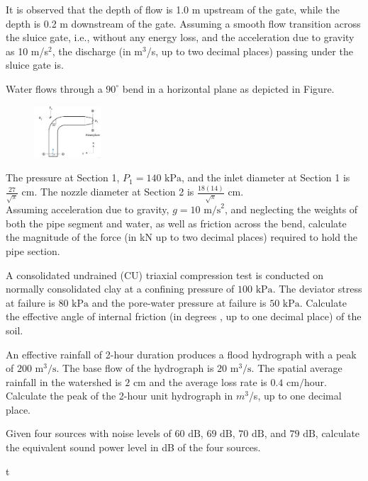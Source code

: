 It is observed that the depth of flow is 1.0 m upstream of the gate, while the depth is 0.2 m downstream of the gate. Assuming a smooth flow transition across the sluice gate, i.e., without any energy loss, and the acceleration due to gravity as 10 m/s$^2$, the discharge (in m$^3$/s, up to two decimal places) passing under the sluice gate is.
\item
Water flows through a $90^{\circ}$ bend in a horizontal plane as depicted in Figure.\\
     \begin{figure}[!ht]
    \centering
    \includegraphics[width=2.5cm]{./GATE-yearwise/2017/figs/Q49.png}
    \end{figure}

The pressure at Section 1, $P_1 = 140 \text{ kPa}$, and the inlet diameter at Section 1 is $\frac{27}{\sqrt{\pi}} \text{ cm}$. The nozzle diameter at Section 2 is $\frac{18(14)}{\sqrt{\pi}} \text{ cm}$. \\
Assuming acceleration due to gravity, $g = 10 \text{ m/s}^2$, and neglecting the weights of both the pipe segment and water, as well as friction across the bend, calculate the magnitude of the force (in kN up to two decimal places) required to hold the pipe section.

\item
A consolidated undrained (CU) triaxial compression test is conducted on normally consolidated clay at a confining pressure of $100 \text{ kPa}$. The deviator stress at failure is $80 \text{ kPa}$ and the pore-water pressure at failure is $50 \text{ kPa}$. Calculate the effective angle of internal friction (in degrees , up to one decimal place) of the soil.

\item
An effective rainfall of 2-hour duration produces a flood hydrograph with a peak of $200 \text{ m}^3/\text{s}$. The base flow of the hydrograph is $20 \text{ m}^3/\text{s}$. The spatial average rainfall in the watershed is $2 \text{ cm}$ and the average loss rate is $0.4 \text{ cm/hour}$. Calculate the peak of the 2-hour unit hydrograph in ${m}^3$/s, up to one decimal place.

\item
Given four sources with noise levels of $60 \text{ dB}$, $69 \text{ dB}$, $70 \text{ dB}$, and $79 \text{ dB}$, calculate the equivalent sound power level in dB of the four sources.

t
